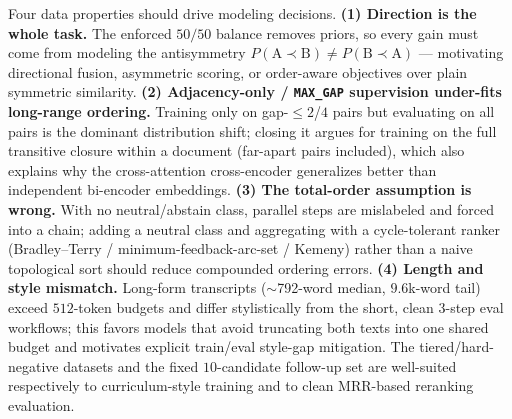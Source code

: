 Four data properties should drive modeling decisions. \textbf{(1) Direction is the whole
task.} The enforced $50/50$ balance removes priors, so every gain must come from modeling
the antisymmetry $P(\text{A}\!\prec\!\text{B}) \neq P(\text{B}\!\prec\!\text{A})$ ---
motivating directional fusion, asymmetric scoring, or order-aware objectives over plain
symmetric similarity. \textbf{(2) Adjacency-only / \texttt{MAX\_GAP} supervision under-fits
long-range ordering.} Training only on gap-$\le$$2$/$4$ pairs but evaluating on all pairs
is the dominant distribution shift; closing it argues for training on the full transitive
closure within a document (far-apart pairs included), which also explains why the
cross-attention cross-encoder generalizes better than independent bi-encoder embeddings.
\textbf{(3) The total-order assumption is wrong.} With no neutral/abstain class, parallel
steps are mislabeled and forced into a chain; adding a neutral class and aggregating with a
cycle-tolerant ranker (Bradley--Terry / minimum-feedback-arc-set / Kemeny) rather than a
naive topological sort should reduce compounded ordering errors. \textbf{(4) Length and
style mismatch.} Long-form transcripts ($\sim$792-word median, $9.6$k-word tail) exceed
$512$-token budgets and differ stylistically from the short, clean $3$-step eval workflows;
this favors models that avoid truncating both texts into one shared budget and motivates
explicit train/eval style-gap mitigation. The tiered/hard-negative datasets and the fixed
$10$-candidate follow-up set are well-suited respectively to curriculum-style training and
to clean MRR-based reranking evaluation.
